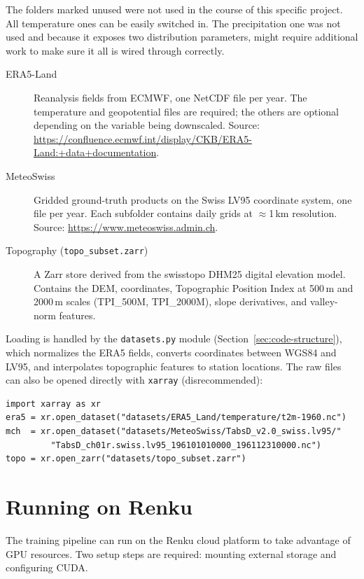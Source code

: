 The folders marked unused were not used in the course of this specific project. All temperature ones can be easily switched in. The precipitation one was not used and because it exposes two distribution parameters, might require additional work to make sure it all is wired through correctly.

\begin{description}
  \item[ERA5-Land] Reanalysis fields from ECMWF, one NetCDF file per year.
  The temperature and geopotential files are required; the others are optional depending on the variable being downscaled.
  Source: \url{https://confluence.ecmwf.int/display/CKB/ERA5-Land:+data+documentation}.

  \item[MeteoSwiss] Gridded ground-truth products on the Swiss LV95 coordinate system, one file per year.
  Each subfolder contains daily grids at $\approx$1\,km resolution.
  Source: \url{https://www.meteoswiss.admin.ch}.

  \item[Topography (\texttt{topo\_subset.zarr})] A Zarr store derived from the swisstopo DHM25 digital elevation model.
  Contains the DEM, coordinates, Topographic Position Index at 500\,m and 2000\,m scales (TPI\_500M, TPI\_2000M), slope derivatives, and valley-norm features.
\end{description}

Loading is handled by the \texttt{datasets.py} module (Section~\ref{sec:code-structure}), which normalizes the ERA5 fields, converts coordinates between WGS84 and LV95, and interpolates topographic features to station locations. The raw files can also be opened directly with \texttt{xarray} (disrecommended):

\begin{verbatim}
import xarray as xr
era5 = xr.open_dataset("datasets/ERA5_Land/temperature/t2m-1960.nc")
mch  = xr.open_dataset("datasets/MeteoSwiss/TabsD_v2.0_swiss.lv95/"
         "TabsD_ch01r.swiss.lv95_196101010000_196112310000.nc")
topo = xr.open_zarr("datasets/topo_subset.zarr")
\end{verbatim}

\section{Running on Renku}
\label{sec:running-on-renku}

The training pipeline can run on the Renku cloud platform to take advantage of GPU resources.
Two setup steps are required: mounting external storage and configuring CUDA.

